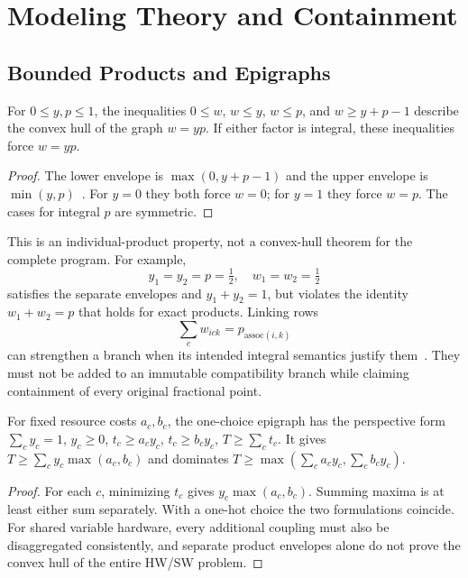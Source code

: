 \section{Modeling Theory and Containment}
\label{sec:theory}\label{app:containment}

\subsection{Bounded Products and Epigraphs}\label{app:bounded_products}
\begin{proposition}\label{prop:mccormick_exact}
For $0\le y,p\le1$, the inequalities $0\le w$, $w\le y$, $w\le p$, and $w\ge y+p-1$ describe the convex hull of the graph $w=yp$.
If either factor is integral, these inequalities force $w=yp$.
\end{proposition}
\begin{proof}
The lower envelope is $\max(0,y+p-1)$ and the upper envelope is $\min(y,p)$~\citep{mccormick1976computability}.
For $y=0$ they both force $w=0$; for $y=1$ they force $w=p$.
The cases for integral $p$ are symmetric.
\end{proof}
This is an individual-product property, not a convex-hull theorem for the complete program.
For example,
\begin{equation}
y_1=y_2=p=\tfrac12,\quad w_1=w_2=\tfrac12
\label{eq:rlt_counterexample}
\end{equation}
satisfies the separate envelopes and $y_1+y_2=1$, but violates the identity $w_1+w_2=p$ that holds for exact products.
Linking rows
\begin{equation}
\sum_c w_{ick}=p_{\mathrm{assoc}(i,k)}
\label{eq:rlt_linking}
\end{equation}
can strengthen a branch when its intended integral semantics justify them~\citep{sherali1990hierarchy}.
They must not be added to an immutable compatibility branch while claiming containment of every original fractional point.

\begin{corollary}\label{cor:v3_hull}
For fixed resource costs $a_c,b_c$, the one-choice epigraph has the perspective form $\sum_c y_c=1$, $y_c\ge0$, $t_c\ge a_cy_c$, $t_c\ge b_cy_c$, $T\ge\sum_ct_c$.
It gives $T\ge\sum_c y_c\max(a_c,b_c)$ and dominates $T\ge\max(\sum_ca_cy_c,\sum_cb_cy_c)$.
\end{corollary}
\begin{proof}
For each $c$, minimizing $t_c$ gives $y_c\max(a_c,b_c)$.
Summing maxima is at least either sum separately.
With a one-hot choice the two formulations coincide.
For shared variable hardware, every additional coupling must also be disaggregated consistently, and separate product envelopes alone do not prove the convex hull of the entire HW/SW problem.
\end{proof}

